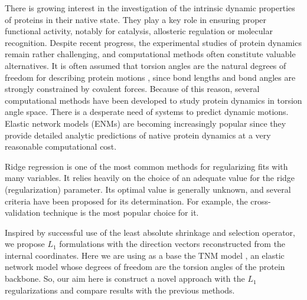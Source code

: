 \documentclass[12pt,twoside]{article}
\begin{document}
        There is growing interest in the investigation of the intrinsic dynamic properties of proteins in their native state. They play a key role in ensuring proper functional activity, notably for catalysis, allosteric regulation or molecular recognition. 
        Despite recent progress, the experimental studies of protein dynamics remain rather challenging, and computational methods often constitute valuable alternatives. 
        It is often assumed that torsion angles are the natural degrees of freedom for describing protein motions \cite{pmid:20867208},
since bond lengths and bond angles are strongly constrained by covalent forces. Because of this reason,
several computational methods have been developed to study protein dynamics in torsion angle space. 
There is a desperate need of systems to predict dynamic motions. 
Elastic network models (ENMs) \cite{PhysRevLett.77.1905, ATILGAN2001505, BAHAR2005586} are becoming increasingly popular since they provide detailed analytic predictions of native protein dynamics at a very reasonable computational cost. 

Ridge regression is one of the most common methods for regularizing fits with many variables.  It relies heavily on the choice of an adequate value for the ridge (regularization) parameter. Its optimal value is generally unknown, and several criteria have been proposed for its determination. 
For example, the cross-validation technique is the most popular choice for it.

Inspired by successful use of the least absolute shrinkage and selection operator, we propose $L_1$  formulations with the direction vectors reconstructed from the internal coordinates. 
Here we are using as a base the TNM model \cite{pmid:20867208}, an elastic network model whose degrees of freedom are the torsion angles of the protein backbone.  So, our aim here is construct a novel approach with the $L_1$ regularizations and compare results with the previous methods. 


  
\end{document}
